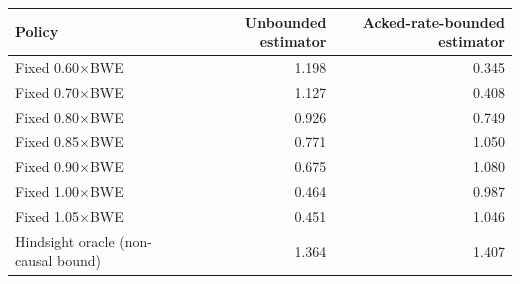 \begin{tabular}{lrr}
\toprule
Policy & Unbounded estimator & Acked-rate-bounded estimator \\
\midrule
Fixed 0.60$\times$BWE & 1.198 & 0.345 \\
Fixed 0.70$\times$BWE & 1.127 & 0.408 \\
Fixed 0.80$\times$BWE & 0.926 & 0.749 \\
Fixed 0.85$\times$BWE & 0.771 & 1.050 \\
Fixed 0.90$\times$BWE & 0.675 & 1.080 \\
Fixed 1.00$\times$BWE & 0.464 & 0.987 \\
Fixed 1.05$\times$BWE & 0.451 & 1.046 \\
Hindsight oracle (non-causal bound) & 1.364 & 1.407 \\
\bottomrule
\end{tabular}
